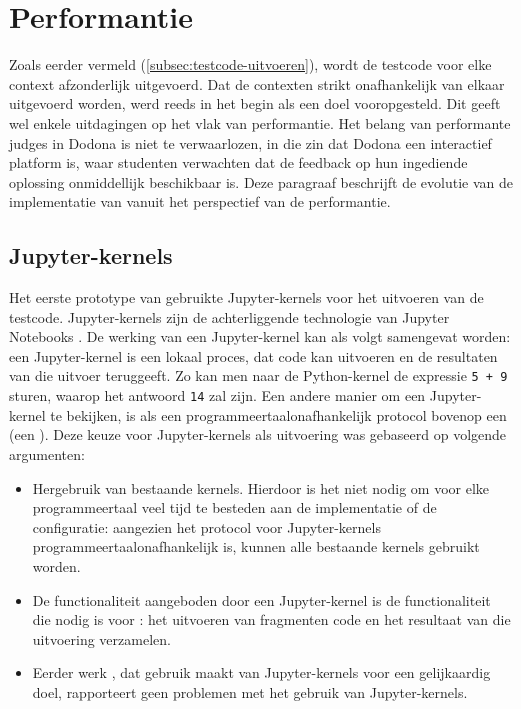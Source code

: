 \section{Performantie}\label{sec:performantie}

Zoals eerder vermeld (\cref{subsec:testcode-uitvoeren}), wordt de testcode voor elke context afzonderlijk uitgevoerd.
Dat de contexten strikt onafhankelijk van elkaar uitgevoerd worden, werd reeds in het begin als een doel vooropgesteld.
Dit geeft wel enkele uitdagingen op het vlak van performantie.
Het belang van performante judges in Dodona is niet te verwaarlozen, in die zin dat Dodona een interactief platform is, waar studenten verwachten dat de feedback op hun ingediende oplossing onmiddellijk beschikbaar is.
Deze paragraaf beschrijft de evolutie van de implementatie van \tested{} vanuit het perspectief van de performantie.

\subsection{Jupyter-kernels}\label{subsec:jupyter-kernels}

Het eerste prototype van \tested{} gebruikte Jupyter-kernels voor het uitvoeren van de testcode.
Jupyter-kernels zijn de achterliggende technologie van Jupyter Notebooks \autocite{jupyter2016}.
De werking van een Jupyter-kernel kan als volgt samengevat worden: een Jupyter-kernel is een lokaal proces, dat code kan uitvoeren en de resultaten van die uitvoer teruggeeft.
Zo kan men naar de Python-kernel de expressie \texttt{5 + 9} sturen, waarop het antwoord \texttt{14} zal zijn.
Een andere manier om een Jupyter-kernel te bekijken, is als een programmeertaalonafhankelijk protocol bovenop een  (een ).
Deze keuze voor Jupyter-kernels als uitvoering was gebaseerd op volgende argumenten:
\begin{itemize}
    \item Hergebruik van bestaande kernels.
    Hierdoor is het niet nodig om voor elke programmeertaal veel tijd te besteden aan de implementatie of de configuratie: aangezien het protocol voor Jupyter-kernels programmeertaalonafhankelijk is, kunnen alle bestaande kernels gebruikt worden.
    \item De functionaliteit aangeboden door een Jupyter-kernel is de functionaliteit die nodig is voor \tested{}: het uitvoeren van fragmenten code en het resultaat van die uitvoering verzamelen.
    \item Eerder werk \autocite{petegem2018}, dat gebruik maakt van Jupyter-kernels voor een gelijkaardig doel, rapporteert geen problemen met het gebruik van Jupyter-kernels.
\end{itemize}

